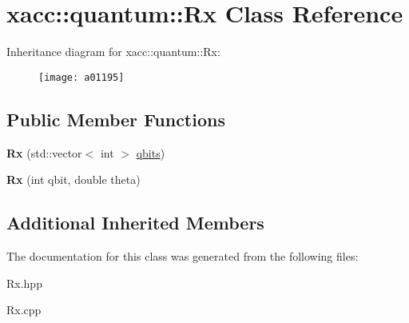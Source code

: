 \hypertarget{a01195}{}\section{xacc\+:\+:quantum\+:\+:Rx Class Reference}
\label{a01195}
Inheritance diagram for xacc\+:\+:quantum\+:\+:Rx\+:\begin{figure}[H]
\begin{center}
\leavevmode
\texttt{[image: a01195]}
\end{center}
\end{figure}
\subsection*{Public Member Functions}
\begin{DoxyCompactItemize}
\item 
\mbox{\label{a01195_a03babfe938a6cbf7f744fcd31a52d92d}} 
{\bfseries Rx} (std\+::vector$<$ int $>$ \hyperlink{a01159_a2a56be6c2519ea65df4d06f4abae1393}{qbits})
\item 
\mbox{\label{a01195_a01667b11d34d5621b98ebff9a07d9bbf}} 
{\bfseries Rx} (int qbit, double theta)
\end{DoxyCompactItemize}
\subsection*{Additional Inherited Members}


The documentation for this class was generated from the following files\+:\begin{DoxyCompactItemize}
\item 
Rx.\+hpp\item 
Rx.\+cpp\end{DoxyCompactItemize}
